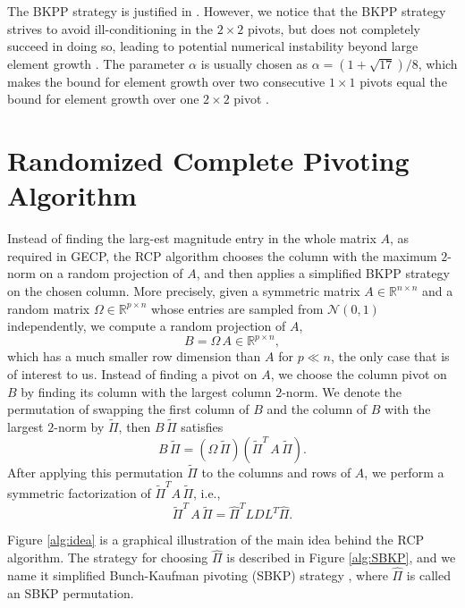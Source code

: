 \documentclass[11pt]{article}
\begin{document}
The BKPP strategy is justified in \cite{bunch1977some}. However, we notice that the BKPP strategy strives to avoid ill-conditioning in the $2\times 2$ pivots, but does not completely succeed in doing so, leading to potential numerical instability beyond large element growth \cite{higham1997stability}. The parameter $\alpha$ is usually chosen as $\alpha = (1 + \sqrt{17}) / 8$, which makes the bound for element growth over two consecutive $1 \times 1$ pivots equal the bound for element growth over one $2 \times 2$ pivot \cite{bunch1977some}.

\section{Randomized Complete Pivoting Algorithm}\label{Sec:RCP}
Instead of finding the larg-est magnitude entry in the whole matrix $A$, as required in GECP, the RCP algorithm chooses the column with the maximum $2$-norm on a random projection of $A$, and then applies a simplified BKPP strategy 
on the chosen column. More precisely, given a symmetric matrix $A \in \mathbb{R}^{n\times n}$ and a random matrix $\Omega \in \mathbb{R}^{p \times n}$ whose entries are sampled from $\mathcal{N}(0,1)$ independently, we compute a random projection of $A$,
\begin{equation*}
B = \Omega \, A \in \mathbb{R}^{p \times n},
\end{equation*}
which has a much smaller row dimension than $A$ for $p \ll n$, the only case that is of interest to us. Instead of finding a pivot on $A$, we choose the column pivot on $B$ by finding its column with the largest column $2$-norm. We denote the permutation of swapping the first column of $B$ and the column of $B$ with the largest $2$-norm by $\widetilde{\Pi}$, then $B \, \widetilde{\Pi}$ satisfies
\begin{equation}\label{Eq:Apply Pi on A B Omega}
B \, \widetilde{\Pi} = \left(\Omega \, \widetilde{\Pi}\right)\left(\widetilde{\Pi}^T\,  A\,  \widetilde{\Pi}\right).
\end{equation}
After applying this permutation $\widetilde{\Pi}$ to the columns and rows of $A$, we perform a symmetric factorization of $\widetilde{\Pi}^T A\, \widetilde{\Pi}$, i.e.,
\begin{equation}\label{Eq:Perform LDL^T on Pi A Pi^T}
\widetilde{\Pi}^T \, A \, \widetilde{\Pi} = \widehat{\Pi}^T L D L^T \widehat{\Pi}.
\end{equation}

Figure \ref{alg:idea} is a graphical illustration of the main idea behind the RCP algorithm. The strategy for choosing $\widehat{\Pi}$ is described in Figure \ref{alg:SBKP}, and we name it simplified Bunch-Kaufman pivoting (SBKP) strategy , where $\widehat{\Pi}$ is called an SBKP permutation. 
\end{document}
